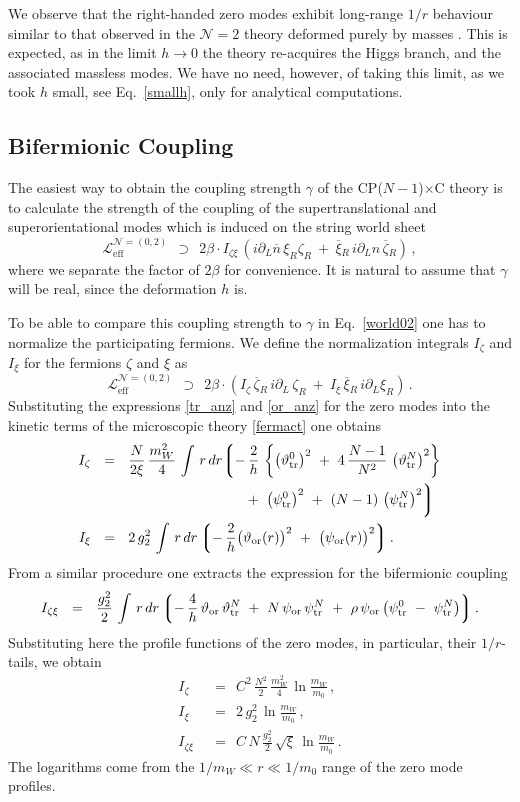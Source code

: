 \documentclass[12pt]{article}
\def\beq{\begin{equation}}
\def\eeq{\end{equation}}
\newcommand{\ntwo}{${\mathcal N}=2$ }
\newcommand{\p}{\partial}
\newcommand{\ov}{\overline}
\newcommand{\mc}[1]{\mathcal{#1}}
\newcommand{\lgr}{\left\lgroup}
\newcommand{\rgr}{\right\rgroup}
\newcommand{\bxir}{\ov{\xi}{}_R}
\newcommand{\xir}{\xi_R}
\newcommand{\bzr}{\ov{\zeta}{}_R}
\newcommand{\zr}{\zeta_R}
\newcommand{\nbar}{\ov{n}}
\newcommand{\pts}{\psi_{\rm tr}^0}
\newcommand{\ptN}{\psi_{\rm tr}^N}
\newcommand{\tts}{\vartheta_{\rm tr}^0}
\newcommand{\ttN}{\vartheta_{\rm tr}^N}
\newcommand{\tor}{\vartheta_{\rm or}}
\newcommand{\por}{\psi_{\rm or}}
\newcommand{\CPC}{CP($N-1$)$\times$C }
\begin{document}
We observe that the right-handed zero modes exhibit long-range $1/r$ behaviour similar to that observed
in the \ntwo theory deformed purely by masses \cite{GSYmmodel,SYhet}. 
This is expected, as in the limit $ h \to 0 $ the theory re-acquires the Higgs branch, and the associated
massless modes. 
We have no need, however, of taking this limit, as we took $ h $ small, 
see Eq.~\eqref{smallh}, only for analytical computations.

\subsection{Bifermionic Coupling}

The easiest way to obtain the coupling strength $ \gamma $ of the \CPC theory
is to calculate the strength of the coupling of the supertranslational and superorientational
modes which is induced on the string world sheet
\beq
\label{bif_norm}
	\mc{L}_\text{eff}^{\mc{N}=(0,2)} ~~\supset~~
	2\beta \cdot I_{\zeta\xi}\, ( i\p_L\nbar\,\xir\zr ~+~ \bxir\,i\p_L n\, \bzr )\,,
\eeq
where we separate the factor of $ 2\beta $ for convenience. 
It is natural to assume that $ \gamma $ will be real, since the deformation $h$ is.

To be able to compare this coupling strength to $ \gamma $ in Eq.~\eqref{world02} one has to normalize 
the participating fermions.
We define the normalization integrals $ I_\zeta $ and $ I_\xi $ for the fermions $ \zeta $ and $ \xi $ as
\beq
\label{kin_norm}
	\mc{L}_\text{eff}^{\mc{N}=(0,2)} ~~\supset~~
	2\beta \cdot ( I_\zeta\, \bzr\, i\p_L\,\zr  ~+~ I_\xi\, \bxir\, i\p_L \xir ) \,.
\eeq
Substituting the expressions \eqref{tr_anz} and \eqref{or_anz} for the zero modes into the kinetic terms
of the microscopic theory \eqref{fermact} one obtains
\begin{align*}
%
	I_\zeta & ~~=~~ \frac{N}{2\xi}\, \frac{m_W^2}{4}\, \int\, r\,dr 
		\biggl\lgroup -\, \frac{2}{h}\, 
			  \left\{ \left( \tts \right)^2 
				~+~ 4\,\frac{N-1}{N^2}\, \left( \ttN \right)^2 \right\} \\
		& \qquad\qquad\qquad\qquad\qquad~~
			~+~ \left( \pts \right)^2 ~+~ (N-1)\,\left( \ptN \right)^2  \biggr\rgroup \\
%
	I_\xi & ~~=~~ 2\,g_2^2\, \int\, r\,dr 
		\lgr -\,\frac{2}{h}\bigl( \tor(r) \bigr)^2 ~+~ \bigl( \por(r) \bigr)^2 \rgr.
\end{align*}
From a similar procedure one extracts the expression for the bifermionic coupling
\[
	I_{\zeta\xi} ~~=~~ \frac{g_2^2}{2}\, \int\, r\,dr
		\lgr -\,\frac{4}{h}\,\tor\,\ttN  ~+~ N\, \por\,\ptN  
			~+~ \rho\, \por \left( \pts ~-~ \ptN \right) \rgr.
\]
Substituting here the profile functions of the zero modes, in particular, their $ 1/r $-tails,
we obtain
\begin{align*}
%
	I_\zeta & ~~=~~ C^2\,\frac{N^2}{2}\,\frac{m_W^2}{4}\, \ln \frac{m_W}{m_0}\,, \\
%
	I_\xi   & ~~=~~ 2\,g_2^2\, \ln \frac{m_W}{m_0}\,, \\
%
	I_{\zeta\xi} & ~~=~~ C\,N\, \frac{g_2^2}{2}\, \sqrt{\xi}\, \ln \frac{m_W}{m_0}\,.
\end{align*}
The logarithms come from the $ 1/m_W \ll r \ll 1/m_0 $ range of the zero mode profiles.
\end{document}
